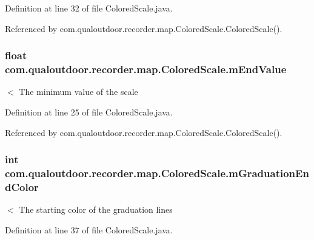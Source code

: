 Definition at line 32 of file Colored\-Scale.\-java.



Referenced by com.\-qualoutdoor.\-recorder.\-map.\-Colored\-Scale.\-Colored\-Scale().

\hypertarget{classcom_1_1qualoutdoor_1_1recorder_1_1map_1_1ColoredScale_a5b5033b8ddba63337370fd55a33606da}{
\subsubsection[{m\-End\-Value}]{\setlength{\rightskip}{0pt plus 5cm}float com.\-qualoutdoor.\-recorder.\-map.\-Colored\-Scale.\-m\-End\-Value\hspace{0.3cm}{\ttfamily [private]}}}\label{classcom_1_1qualoutdoor_1_1recorder_1_1map_1_1ColoredScale_a5b5033b8ddba63337370fd55a33606da}
$<$ The minimum value of the scale 

Definition at line 25 of file Colored\-Scale.\-java.



Referenced by com.\-qualoutdoor.\-recorder.\-map.\-Colored\-Scale.\-Colored\-Scale().

\hypertarget{classcom_1_1qualoutdoor_1_1recorder_1_1map_1_1ColoredScale_a1da3cc13ab28d256b0db3abf714d035a}{
\subsubsection[{m\-Graduation\-End\-Color}]{\setlength{\rightskip}{0pt plus 5cm}int com.\-qualoutdoor.\-recorder.\-map.\-Colored\-Scale.\-m\-Graduation\-End\-Color\hspace{0.3cm}{\ttfamily [private]}}}\label{classcom_1_1qualoutdoor_1_1recorder_1_1map_1_1ColoredScale_a1da3cc13ab28d256b0db3abf714d035a}
$<$ The starting color of the graduation lines 

Definition at line 37 of file Colored\-Scale.\-java.



